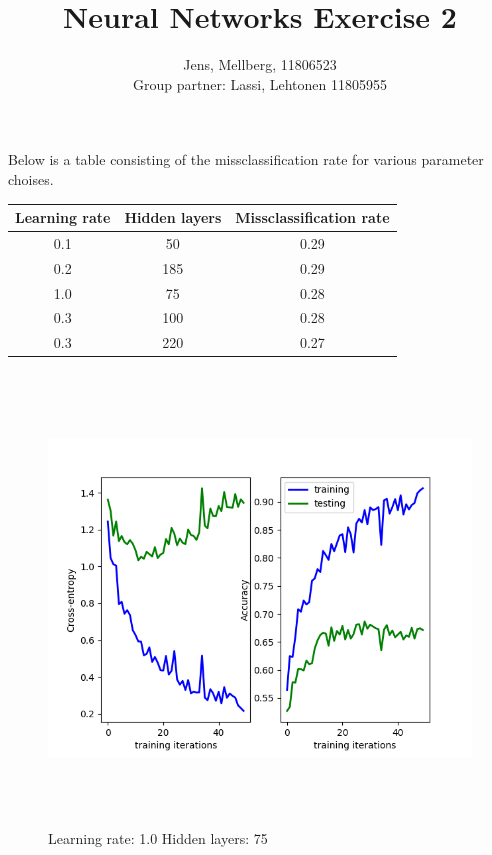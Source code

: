 \documentclass[a4paper]{article}
\title{Neural Networks Exercise 2}
\author{Jens, Mellberg, 11806523\\
		Group partner: Lassi, Lehtonen 11805955}
\begin{document}
\maketitle


Below is a table consisting of the missclassification rate for various parameter choises. 


\begin{center}
	    \begin{tabular}{ |c|c|c|} 
 	        \hline
	        \textbf{Learning rate } & \textbf{Hidden layers} &\textbf{Missclassification rate} \\
	        \hline
	        0.1 & 50 & 0.29\\
 	        0.2 & 185 & 0.29\\
 	        1.0 & 75 & 0.28\\
 	        0.3 & 100 & 0.28\\
 	        0.3 & 220 & 0.27\\
 	        \hline
        \end{tabular}
    \end{center}
    
    
    
    

\begin{figure}[h]
\caption{Learning rate: 1.0 Hidden layers: 75}
\centering
\includegraphics[width=15cm, height=12cm]{LR10HL75}
\end{figure}
\end{document}
